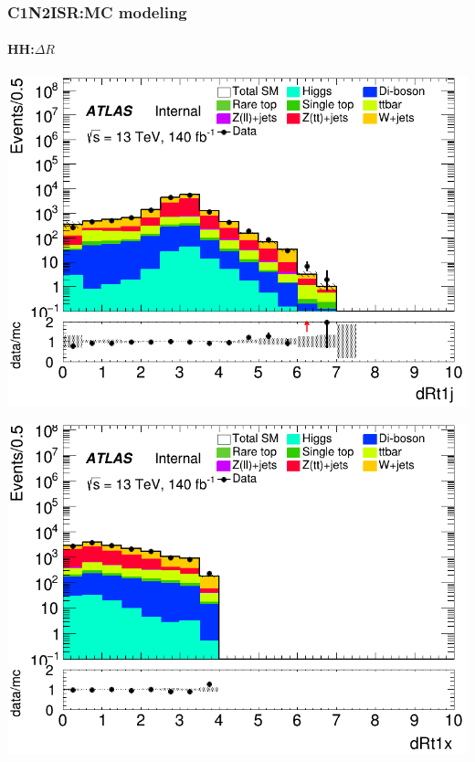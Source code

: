\documentclass[usenames,dvipsnames]{beamer}
\begin{document}
\begin{frame}
\frametitle{C1N2ISR:MC modeling}
\framesubtitle{HH:\quad $\Delta R$}
    \begin{minipage}{0.32\textwidth}
        \centering
        \includegraphics[width=\textwidth]{graphics/HH_met/HH_met_dRt1j.png}
    \end{minipage}
    \hfill
    \begin{minipage}{0.32\textwidth}
        \centering
        \includegraphics[width=\textwidth]{graphics/HH_met/HH_met_dRt1x.png}
    \end{minipage}
    \hfill
    \begin{minipage}{0.32\textwidth}
        \centering

\end{minipage}
\end{frame}
\end{document}
